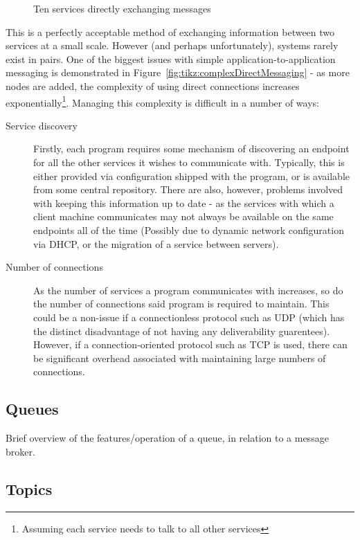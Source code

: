 \begin{figure}[ht]
  \centering
  
  \caption{Ten services directly exchanging messages}
  \label{fig:tikz:directMessaging}
\end{figure}

This is a perfectly acceptable method of exchanging information between two services at a small scale. However (and perhaps unfortunately), systems rarely exist in pairs. One of the biggest issues with simple application-to-application messaging is demonstrated in Figure~\ref{fig:tikz:complexDirectMessaging} - as more nodes are added, the complexity of using direct connections increases exponentially\footnote{Assuming each service needs to talk to all other services}. Managing this complexity is difficult in a number of ways:

\begin{description}
  \item[Service discovery] Firstly, each program requires some mechanism of discovering an endpoint for all the other services it wishes to communicate with. Typically, this is either provided via configuration shipped with the program, or is available from some central repository. There are also, however, problems involved with keeping this information up to date - as the services with which a client machine communicates may not always be available on the same endpoints all of the time (Possibly due to dynamic network configuration via DHCP, or the migration of a service between servers).
  \item[Number of connections] As the number of services a program communicates with increases, so do the number of connections said program is required to maintain. This could be a non-issue if a connectionless protocol such as UDP (which has the distinct disadvantage of not having any deliverability guarentees). However, if a connection-oriented protocol such as TCP is used, there can be significant overhead associated with maintaining large numbers of connections.
\end{description}

\subsection{Queues}
\label{sub:Queues}

Brief overview of the features/operation of a queue, in relation to a message broker.


\subsection{Topics}
\label{sub:Topics}

